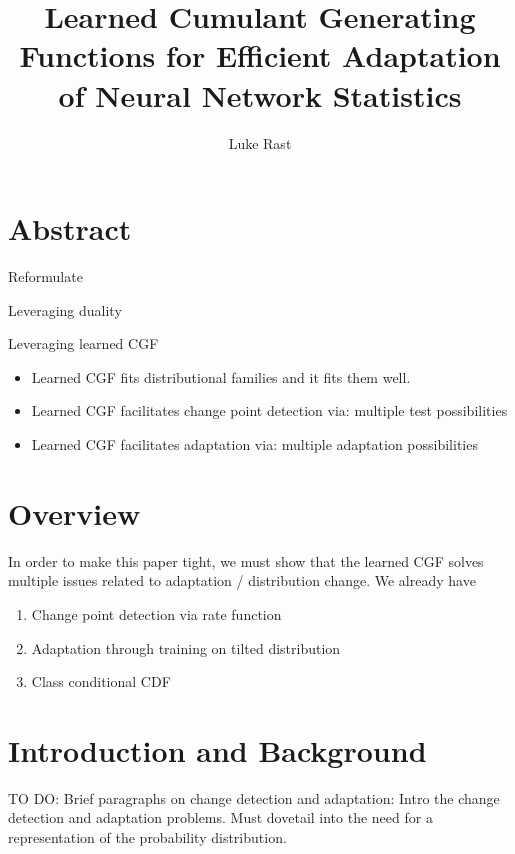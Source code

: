 \documentclass[10pt]{article}      %
\begin{document}
\title{Learned Cumulant Generating Functions for Efficient Adaptation of Neural Network Statistics}
\author{Luke Rast}
\maketitle

\doublespacing
\linenumbers


\section{Abstract}

Reformulate

Leveraging duality 

Leveraging learned CGF

\begin{itemize}
  \item Learned CGF fits distributional families and it fits them well.
  \item Learned CGF facilitates change point detection via: multiple test possibilities
  \item Learned CGF facilitates adaptation via: multiple adaptation possibilities
\end{itemize}



\section{Overview}

In order to make this paper tight, we must show that the learned CGF solves multiple issues related to adaptation / distribution change.
We already have
\begin{enumerate}
  \item Change point detection via rate function
  \item Adaptation through training on tilted distribution
  \item Class conditional CDF
\end{enumerate}


\section{Introduction and Background}


TO DO: Brief paragraphs on change detection and adaptation: Intro the change detection and adaptation problems.
Must dovetail into the need for a representation of the probability distribution.
\end{document}
